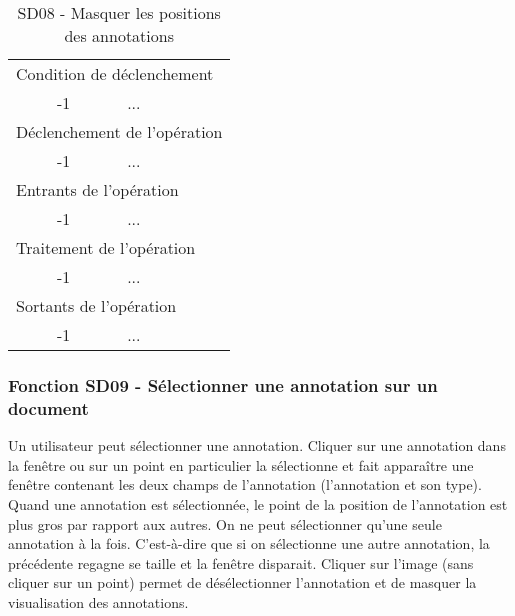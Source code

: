 \documentclass[a4paper]{article}
\begin{document}
\begin{table}[H]
  \centering
   \small
	\begin{tabular}{|c|p{12cm}|}
   		\hline
   			\rowcolor{lightgray}\multicolumn{2}{|c|}{\textbf{SD08 - Masquer les positions des annotations}} \\
   		\hline
   			\multicolumn{2}{|l|}{Condition de d\'eclenchement} \\
   		\hline
   			-1 & ...\\
   		\hline
   			\multicolumn{2}{|l|}{D\'eclenchement de l'op\'eration} \\
   		\hline
   			-1 & ...\\
   		\hline
   			\multicolumn{2}{|l|}{Entrants de l'op\'eration} \\
   		\hline
   			-1 & ...\\
   		\hline
   			\multicolumn{2}{|l|}{Traitement de l'op\'eration} \\
  		\hline
   			-1 & ...\\
   		\hline
   			\multicolumn{2}{|l|}{Sortants de l'op\'eration} \\
   		\hline
   			-1 & ...\\
   		\hline
	\end{tabular}
  \caption{SD08 - Masquer les positions des annotations}
  \normalsize
  \label{tab:masquer_position_annotation}
\end{table}

\subsubsection{Fonction SD09 - Sélectionner une annotation sur un document}
Un utilisateur peut sélectionner une annotation. Cliquer sur une annotation dans la fenêtre ou sur un point en particulier la sélectionne et fait apparaître une fenêtre contenant les deux champs de l’annotation (l’annotation et son type). Quand une annotation est sélectionnée, le point de la position de l’annotation est plus gros par rapport aux autres. On ne peut sélectionner qu’une seule annotation à la fois. C’est-à-dire que si on sélectionne une autre annotation, la précédente regagne se taille et la fenêtre disparait. Cliquer sur l’image (sans cliquer sur un point) permet de désélectionner l’annotation et de masquer la visualisation des annotations.\\
\end{document}

